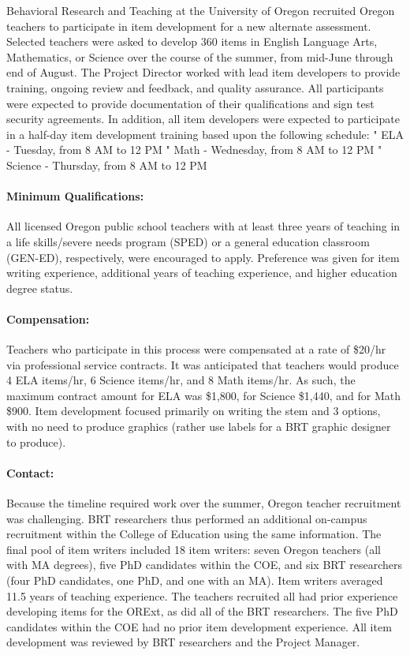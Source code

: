 \documentclass[]{article}
\let\oldparagraph\paragraph
\renewcommand{\paragraph}[1]{\oldparagraph{#1}\mbox{}}
\begin{document}
Behavioral Research and Teaching at the University of Oregon recruited
Oregon teachers to participate in item development for a new alternate
assessment. Selected teachers were asked to develop 360 items in English
Language Arts, Mathematics, or Science over the course of the summer,
from mid-June through end of August. The Project Director worked with
lead item developers to provide training, ongoing review and feedback,
and quality assurance. All participants were expected to provide
documentation of their qualifications and sign test security agreements.
In addition, all item developers were expected to participate in a
half-day item development training based upon the following schedule: "
ELA - Tuesday, from 8 AM to 12 PM " Math - Wednesday, from 8 AM to 12 PM
" Science - Thursday, from 8 AM to 12 PM

\paragraph{Minimum Qualifications:}\label{minimum-qualifications}

All licensed Oregon public school teachers with at least three years of
teaching in a life skills/severe needs program (SPED) or a general
education classroom (GEN-ED), respectively, were encouraged to apply.
Preference was given for item writing experience, additional years of
teaching experience, and higher education degree status.

\paragraph{Compensation:}\label{compensation}

Teachers who participate in this process were compensated at a rate of
\$20/hr via professional service contracts. It was anticipated that
teachers would produce 4 ELA items/hr, 6 Science items/hr, and 8 Math
items/hr. As such, the maximum contract amount for ELA was \$1,800, for
Science \$1,440, and for Math \$900. Item development focused primarily
on writing the stem and 3 options, with no need to produce graphics
(rather use labels for a BRT graphic designer to produce).

\paragraph{Contact:}\label{contact}

Because the timeline required work over the summer, Oregon teacher
recruitment was challenging. BRT researchers thus performed an
additional on-campus recruitment within the College of Education using
the same information. The final pool of item writers included 18 item
writers: seven Oregon teachers (all with MA degrees), five PhD
candidates within the COE, and six BRT researchers (four PhD candidates,
one PhD, and one with an MA). Item writers averaged 11.5 years of
teaching experience. The teachers recruited all had prior experience
developing items for the ORExt, as did all of the BRT researchers. The
five PhD candidates within the COE had no prior item development
experience. All item development was reviewed by BRT researchers and the
Project Manager.
\end{document}
